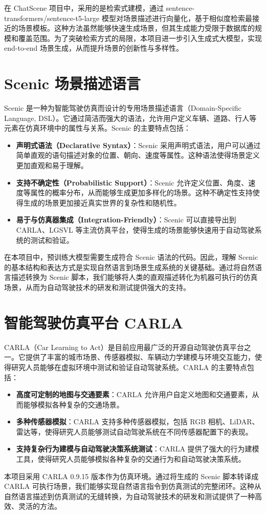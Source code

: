 在 ChatScene 项目中，采用的是检索式建模，通过 sentence-transformers/sentence-t5-large 模型对场景描述进行向量化，基于相似度检索最接近的场景模板。这种方法虽然能够快速生成场景，但其生成能力受限于数据库的规模和覆盖范围。为了突破检索方式的局限，本项目进一步引入生成式大模型，实现 end-to-end 场景生成，从而提升场景的创新性与多样性。

\section{Scenic 场景描述语言}
Scenic 是一种为智能驾驶仿真而设计的专用场景描述语言（Domain-Specific Language, DSL）。它通过简洁而强大的语法，允许用户定义车辆、道路、行人等元素在仿真环境中的属性与关系。Scenic 的主要特点包括：
\begin{itemize}
	\item \textbf{声明式语法（Declarative Syntax）}：Scenic 采用声明式语法，用户可以通过简单直观的语句描述对象的位置、朝向、速度等属性。这种语法使得场景定义更加直观和易于理解。
	\item \textbf{支持不确定性（Probabilistic Support）}：Scenic 允许定义位置、角度、速度等属性的概率分布，从而能够生成更加多样化的场景。这种不确定性支持使得生成的场景更加接近真实世界的复杂性和随机性。
	\item \textbf{易于与仿真器集成（Integration-Friendly）}：Scenic 可以直接导出到 CARLA、LGSVL 等主流仿真平台，使得生成的场景能够快速用于自动驾驶系统的测试和验证。
\end{itemize}

在本项目中，预训练大模型需要生成符合 Scenic 语法的代码。因此，理解 Scenic 的基本结构和表达方式是实现自然语言到场景生成系统的关键基础。通过将自然语言描述转换为 Scenic 脚本，我们能够将人类的直观描述转化为机器可执行的仿真场景，从而为自动驾驶技术的研发和测试提供强大的支持。

\section{智能驾驶仿真平台 CARLA}
CARLA（Car Learning to Act）是目前应用最广泛的开源自动驾驶仿真平台之一。它提供了丰富的城市场景、传感器模拟、车辆动力学建模与环境交互能力，使得研究人员能够在虚拟环境中测试和验证自动驾驶系统。CARLA 的主要特点包括：
\begin{itemize}
	\item \textbf{高度可定制的地图与交通要素}：CARLA 允许用户自定义地图和交通要素，从而能够模拟各种复杂的交通场景。
	\item \textbf{多种传感器模拟}：CARLA 支持多种传感器模拟，包括 RGB 相机、LiDAR、雷达等，使得研究人员能够测试自动驾驶系统在不同传感器配置下的表现。
	\item \textbf{支持复杂行为建模与自动驾驶决策系统测试}：CARLA 提供了强大的行为建模工具，使得研究人员能够模拟各种复杂的交通行为和自动驾驶决策系统。
\end{itemize}
本项目采用 CARLA 0.9.15 版本作为仿真环境。通过将生成的 Scenic 脚本转译成 CARLA 可执行场景，我们能够实现自然语言指令到仿真测试的完整闭环。这种从自然语言描述到仿真测试的无缝转换，为自动驾驶技术的研发和测试提供了一种高效、灵活的方法。

